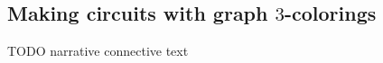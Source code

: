 \documentclass{report-snippet}
\begin{document}
%
%
%
%

\subsection{Making circuits with graph \(3\)-colorings}

TODO narrative connective text
\end{document}
